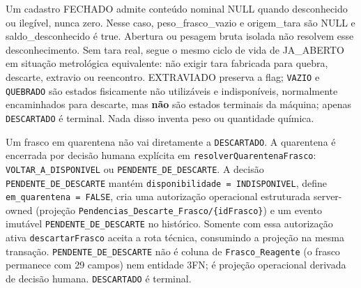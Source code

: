 \begin{regra}
Um cadastro FECHADO admite conteúdo nominal NULL quando desconhecido ou ilegível, nunca zero. Nesse caso, peso\_frasco\_vazio e origem\_tara são NULL e saldo\_desconhecido é true. Abertura ou pesagem bruta isolada não resolvem esse desconhecimento. Sem tara real, segue o mesmo ciclo de vida de JA\_ABERTO em situação metrológica equivalente: não exigir tara fabricada para quebra, descarte, extravio ou reencontro. EXTRAVIADO preserva a flag; \texttt{VAZIO} e \texttt{QUEBRADO} são estados fisicamente não utilizáveis e indisponíveis, normalmente encaminhados para descarte, mas \textbf{não} são estados terminais da máquina; apenas \texttt{DESCARTADO} é terminal. Nada disso inventa peso ou quantidade química.
\end{regra}

\begin{regra}
Um frasco em quarentena não vai diretamente a \texttt{DESCARTADO}. A quarentena é encerrada por decisão humana explícita em \texttt{resolverQuarentenaFrasco}: \texttt{VOLTAR\_A\_DISPONIVEL} ou \texttt{PENDENTE\_DE\_DESCARTE}. A decisão \texttt{PENDENTE\_DE\_DESCARTE} mantém \texttt{disponibilidade = INDISPONIVEL}, define \texttt{em\_quarentena = FALSE}, cria uma autorização operacional estruturada server-owned (projeção \texttt{Pendencias\_Descarte\_Frasco/\{idFrasco\}}) e um evento imutável \texttt{PENDENTE\_DE\_DESCARTE} no histórico. Somente com essa autorização ativa \texttt{descartarFrasco} aceita a rota técnica, consumindo a projeção na mesma transação. \texttt{PENDENTE\_DE\_DESCARTE} não é coluna de \texttt{Frasco\_Reagente} (o frasco permanece com 29 campos) nem entidade 3FN; é projeção operacional derivada de decisão humana. \texttt{DESCARTADO} é terminal.
\end{regra}

